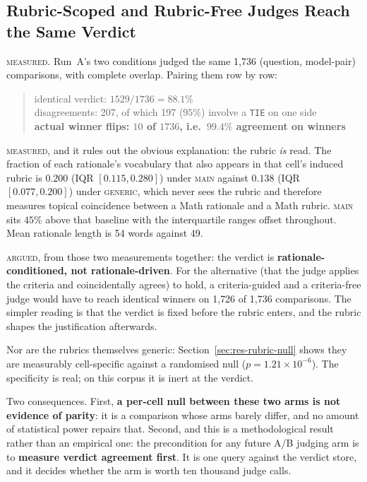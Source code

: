 \subsection{Rubric-Scoped and Rubric-Free Judges Reach the Same Verdict}\label{sec:res-generic-judge}

\textsc{measured.} Run~A's two conditions judged the same 1{,}736
(question, model-pair) comparisons, with complete overlap. Pairing them
row by row:

\begin{quote}
identical verdict: $1529/1736 = 88.1\%$ \\
disagreements: 207, of which 197 ($95\%$) involve a \texttt{TIE} on one
side \\
\textbf{actual winner flips: $10$ of $1736$, i.e.\ $99.4\%$ agreement
on winners}
\end{quote}

\textsc{measured}, and it rules out the obvious explanation: the rubric
\emph{is} read. The fraction of each rationale's vocabulary that also
appears in that cell's induced rubric is $0.200$ (IQR $[0.115, 0.280]$)
under \textsc{main} against $0.138$ (IQR $[0.077, 0.200]$) under
\textsc{generic}, which never sees the rubric and therefore
measures topical coincidence between a Math rationale and a Math
rubric. \textsc{main} sits $45\%$ above that baseline with the
interquartile ranges offset throughout. Mean rationale length is 54
words against 49.

\textsc{argued}, from those two measurements together: the verdict is
\textbf{rationale-conditioned, not rationale-driven}. For the
alternative (that the judge applies the criteria and coincidentally
agrees) to hold, a criteria-guided and a criteria-free judge would
have to reach identical winners on 1{,}726 of 1{,}736 comparisons. The
simpler reading is that the verdict is fixed before the rubric enters,
and the rubric shapes the justification afterwards.

Nor are the rubrics themselves generic:
Section~\ref{sec:res-rubric-null} shows they are measurably
cell-specific against a randomised null
($p = 1.21 \times 10^{-6}$). The specificity is real; on this corpus
it is inert at the verdict.

Two consequences. First, \textbf{a per-cell null between these two arms
is not evidence of parity}: it is a comparison whose arms barely
differ, and no amount of statistical power repairs that. Second, and
this is a methodological result rather than an empirical one: the
precondition for any future A/B judging arm is to \textbf{measure
verdict agreement first}. It is one query against the verdict store,
and it decides whether the arm is worth ten thousand judge calls.

